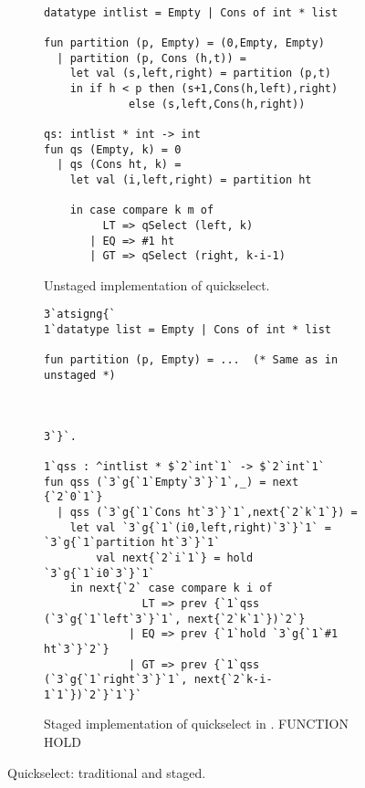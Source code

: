 
\begin{figure*}
\begin{subfigure}[t]{0.45\textwidth}
\begin{lstlisting} 

datatype intlist = Empty | Cons of int * list

fun partition (p, Empty) = (0,Empty, Empty) 
  | partition (p, Cons (h,t)) = 
    let val (s,left,right) = partition (p,t) 
    in if h < p then (s+1,Cons(h,left),right) 
             else (s,left,Cons(h,right))

qs: intlist * int -> int
fun qs (Empty, k) = 0
  | qs (Cons ht, k) =
    let val (i,left,right) = partition ht

    in case compare k m of
         LT => qSelect (left, k)
       | EQ => #1 ht
       | GT => qSelect (right, k-i-1)
\end{lstlisting}
\caption{Unstaged implementation of quickselect.}
\label{fig:qs-unstaged}
\end{subfigure}
\hfill
\begin{subfigure}[t]{0.55\textwidth}
\begin{lstlisting} 
3`atsigng{`  
1`datatype list = Empty | Cons of int * list

fun partition (p, Empty) = ...  (* Same as in unstaged *)



3`}`.

1`qss : ^intlist * $`2`int`1` -> $`2`int`1`
fun qss (`3`g{`1`Empty`3`}`1`,_) = next {`2`0`1`}
  | qss (`3`g{`1`Cons ht`3`}`1`,next{`2`k`1`}) = 
    let val `3`g{`1`(i0,left,right)`3`}`1` = `3`g{`1`partition ht`3`}`1`
        val next{`2`i`1`} = hold `3`g{`1`i0`3`}`1`
    in next{`2` case compare k i of
               LT => prev {`1`qss (`3`g{`1`left`3`}`1`, next{`2`k`1`})`2`}
             | EQ => prev {`1`hold `3`g{`1`#1 ht`3`}`2`}
             | GT => prev {`1`qss (`3`g{`1`right`3`}`1`, next{`2`k-i-1`1`})`2`}`1`}`
\end{lstlisting}
\caption{Staged implementation of quickselect in \lang. FUNCTION HOLD}

\label{fig:qs-staged}
\end{subfigure}
\caption{Quickselect: traditional and staged.}
\end{figure*}

